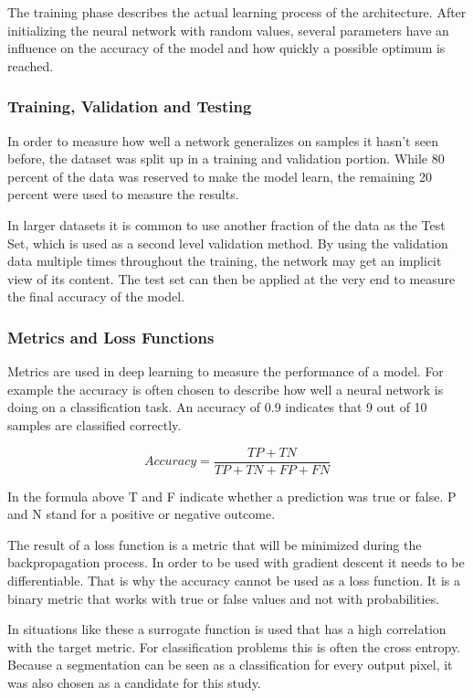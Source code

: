 The training phase describes the actual learning process of the architecture. After initializing the neural network with random values, several parameters have an influence on the accuracy of the model and how quickly a possible optimum is reached.

\subsubsection{Training, Validation and Testing}

In order to measure how well a network generalizes on samples it hasn't seen before, the dataset was split up in a training and validation portion. While 80 percent of the data was reserved to make the model learn, the remaining 20 percent were used to measure the results.

In larger datasets it is common to use another fraction of the data as the Test Set, which is used as a second level validation method. By using the validation data multiple times throughout the training, the network may get an implicit view of its content. The test set can then be applied at the very end to measure the final accuracy of the model.

\subsubsection{Metrics and Loss Functions}

Metrics are used in deep learning to measure the performance of a model. For example the accuracy is often chosen to describe how well a neural network is doing on a classification task. An accuracy of 0.9 indicates that 9 out of 10 samples are classified correctly.

\begin{equation}
Accuracy = \frac{TP+TN}{TP+TN+FP+FN}
\end{equation}

In the formula above T and F indicate whether a prediction was true or false. P and N stand for a positive or negative outcome.

The result of a loss function is a metric that will be minimized during the backpropagation process. In order to be used with gradient descent it needs to be differentiable. That is why the accuracy cannot be used as a loss function. It is a binary metric that works with true or false values and not with probabilities.

In situations like these a surrogate function is used that has a high correlation with the target metric. For classification problems this is often the cross entropy. Because a segmentation can be seen as a classification for every output pixel, it was also chosen as a candidate for this study.

